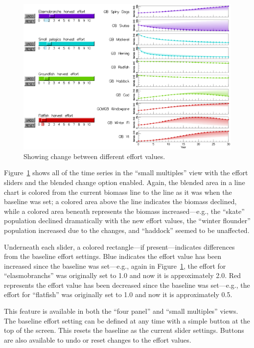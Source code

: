 \begin{figure}[h]
	\centering
	\includegraphics[width=12cm]{figures/eps/msprod_change.eps}
	\caption{Showing change between different effort values.}
	\label{fig:msprod_change}
\end{figure}

Figure~\ref{fig:msprod_change} shows all of the time series in the ``small multiples'' view with the effort sliders and the blended change option enabled.  Again, the blended area in a line chart is colored from the current biomass line to the line as it was when the baseline was set; a colored area above the line indicates the biomass declined, while a colored area beneath represents the biomass increased---e.g., the ``skate'' population declined dramatically with the new effort values, the ``winter flounder'' population increased due to the changes, and ``haddock'' seemed to be unaffected.

Underneath each slider, a colored rectangle---if present---indicates differences from the baseline effort settings.  Blue indicates the effort value has been increased since the baseline was set---e.g., again in Figure~\ref{fig:msprod_change}, the effort for ``elasmobranchs'' was originally set to 1.0 and now it is approximately 2.0.  Red represents the effort value has been decreased since the baseline was set---e.g., the effort for ``flatfish'' was originally set to 1.0 and now it is approximately 0.5.

This feature is available in both the ``four panel'' and ``small multiples'' views.  The baseline effort setting can be defined at any time with a simple button at the top of the screen.  This resets the baseline as the current slider settings.  Buttons are also available to undo or reset changes to the effort values.

